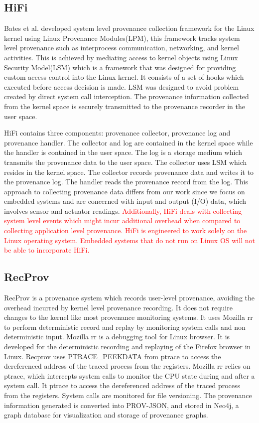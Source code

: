 \subsection{HiFi}
Bates et al. \cite{hi_fi}  developed system level provenance collection framework for the Linux kernel using Linux Provenance Modules(LPM), this framework tracks system level provenance such as interprocess communication, networking, and kernel activities. This is achieved by mediating access to kernel objects using Linux Security Model(LSM) which is a framework that was designed for providing custom access control into the Linux kernel. It consists of a set of hooks which executed before access decision is made. LSM was designed to avoid problem created by direct system call interception. The provenance information collected from the kernel space is securely transmitted to the provenance recorder in the user space. 
\par HiFi contains three components: provenance collector, provenance log and provenance handler. The collector and log are contained in the kernel space while the handler is contained in the user space. The log is a storage medium which transmits the provenance data to the user space. The collector uses LSM which resides in the kernel space. The collector records provenance data and writes it to the provenance log. The handler reads the provenance record from the log. This approach to collecting provenance data differs from our work since we focus on embedded systems and are concerned with input and output (I/O) data, which involves sensor and actuator readings. \textcolor{red}{ Additionally,  HiFi deals with collecting system level events which might incur additional overhead when compared to collecting application level provenance. HiFi is engineered to work solely on the Linux operating system. Embedded systems that do not run on Linux OS will not be able to incorporate HiFi. } 


\subsection{RecProv}

RecProv \cite{rec_prov} is a provenance system which records user-level provenance, avoiding the overhead incurred by kernel level provenance recording. It does not require changes to the kernel like most provenance monitoring systems. It uses Mozilla rr to perform deterministic record and replay by monitoring system calls  and non deterministic input. Mozilla rr is a debugging tool for Linux browser. It is developed for the deterministic recording and replaying of the Firefox browser in Linux. Recprov uses PTRACE\_PEEKDATA from ptrace to access the dereferenced address of the traced process from the registers. Mozilla rr relies on ptrace, which intercepts system calls to monitor the CPU state during and after a system call. It ptrace to access the dereferenced address of the traced process from the registers. System calls are monitored for file versioning. The provenance information generated is converted into PROV-JSON, and stored in Neo4j, a graph database for visualization and storage of provenance graphs. 


